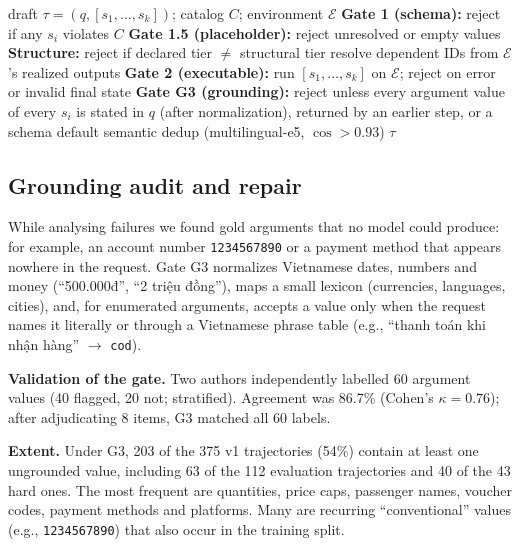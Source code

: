 \documentclass[conference,a4paper]{IEEEtran}
\begin{document}
\begin{algorithm}[t]
\caption{ViTool trajectory validation (v1.2)}
\label{alg:gates}
\begin{algorithmic}[1]
\REQUIRE draft $\tau=(q,[s_1,\dots,s_k])$; catalog $C$; environment $\mathcal{E}$
\STATE \textbf{Gate 1 (schema):} reject if any $s_i$ violates $C$
\STATE \textbf{Gate 1.5 (placeholder):} reject unresolved or empty values
\STATE \textbf{Structure:} reject if declared tier $\neq$ structural tier
\STATE resolve dependent IDs from $\mathcal{E}$'s realized outputs
\STATE \textbf{Gate 2 (executable):} run $[s_1,\dots,s_k]$ on $\mathcal{E}$;
reject on error or invalid final state
\STATE \textbf{Gate G3 (grounding):} reject unless every argument value of every
$s_i$ is stated in $q$ (after normalization), returned by an earlier step, or a
schema default
\STATE semantic dedup (multilingual-e5, $\cos>0.93$)
\RETURN $\tau$
\end{algorithmic}
\end{algorithm}

\subsection{Grounding audit and repair}
\label{sec:grounding}
While analysing failures we found gold arguments that no model could produce:
for example, an account number \texttt{1234567890} or a payment method that
appears nowhere in the request. Gate G3 normalizes Vietnamese dates, numbers and
money (``500.000đ'', ``2 triệu đồng''), maps a small lexicon (currencies,
languages, cities), and, for enumerated arguments, accepts a value only when the
request names it literally or through a Vietnamese phrase table (e.g.,
``thanh toán khi nhận hàng'' $\rightarrow$ \texttt{cod}).

\textbf{Validation of the gate.} Two authors independently labelled 60
argument values (40 flagged, 20 not; stratified). Agreement was 86.7\%
(Cohen's $\kappa=0.76$); after adjudicating 8 items, G3 matched all 60 labels.

\textbf{Extent.} Under G3, 203 of the 375 v1 trajectories (54\%) contain at
least one ungrounded value, including 63 of the 112 evaluation trajectories and 40
of the 43 hard ones. The most frequent are quantities, price caps, passenger
names, voucher codes, payment methods and platforms. Many are recurring
``conventional'' values (e.g., \texttt{1234567890}) that also occur in the
training split.
\end{document}
